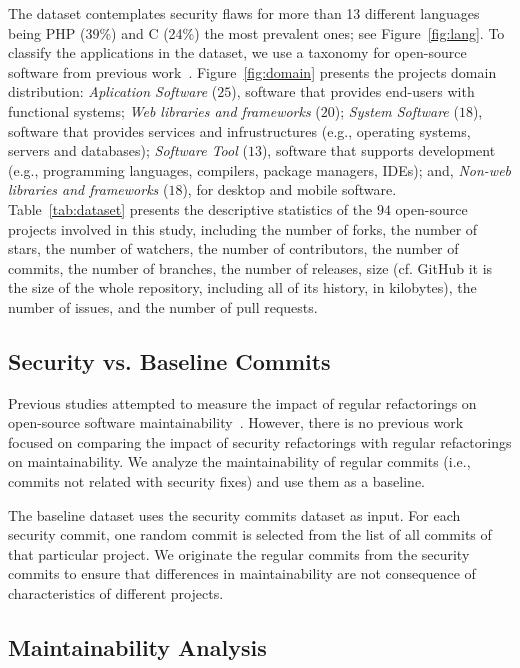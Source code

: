 \documentclass[10pt,conference]{IEEEtran}
\begin{document}
The dataset contemplates security flaws for more than 13 different languages
being PHP (39\%) and C (24\%) the most prevalent ones; see Figure~\ref{fig:lang}.
To classify the applications in the dataset, we use a taxonomy for open-source
software from previous work~\cite{7816479}. Figure~\ref{fig:domain}
presents the projects domain distribution: \textit{Aplication Software} ($25$),
software that provides end-users with functional systems; \textit{Web libraries
and frameworks} ($20$); \textit{System Software} ($18$), software that provides
services and infrustructures (e.g., operating systems, servers and databases);
\textit{Software Tool} ($13$), software that supports development (e.g.,
programming languages, compilers, package managers, IDEs); and, \textit{Non-web
libraries and frameworks} ($18$), for desktop and mobile software.
%
Table~\ref{tab:dataset} presents the descriptive statistics of the $94$
open-source projects involved in this study, including the number of forks, the number of
stars, the number of watchers, the number of contributors, the number of commits, the number of
branches, the number of releases,  size (cf. GitHub it is the size of the whole
repository, including all of its history, in kilobytes), the number of issues, and the
number of pull requests.


%
\subsection{Security vs. Baseline Commits}
%
Previous studies attempted to measure the impact of regular refactorings on
open-source software maintainability~\cite{HEGEDUS2018313}. However,
there is no previous work focused on comparing the impact of security
refactorings with regular refactorings on maintainability.
We analyze the maintainability of regular commits
(i.e., commits not related with security fixes) and use them as a baseline.

The baseline dataset uses the security commits dataset as input. For each
security commit, one random commit is selected from the list of all commits of
that particular project. We originate the regular commits from the security
commits to ensure that differences in maintainability are not consequence of
characteristics of different projects.
%
\subsection{Maintainability Analysis}
\end{document}
